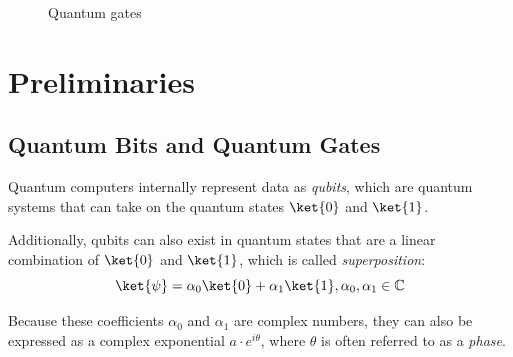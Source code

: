 \begin{figure}[t]
  \begin{minipage}{0.45\linewidth}
    \centering
    \scalebox{1.0} {
      
    }
    \scalebox{1.0} {
      
    }
    \scalebox{1.0}{
      
    }
    \scalebox{1.0} {
      
    }
  \end{minipage}
  \begin{minipage}{0.45\linewidth}
  \centering
    \scalebox{1.0} {
      
    }
    \scalebox{1.0} {
      
    }
    \scalebox{1.0} {
      
    }
    \scalebox{1.0} {
      
    }
  \end{minipage}
  \caption{Quantum gates}
  \label{fig-gates}
\end{figure}

\section{Preliminaries}
\label{Pre}
\subsection{Quantum Bits and Quantum Gates}
\label{Chap:Pre-qubits}
Quantum computers internally represent data as \emph{qubits}, which are quantum systems that can
take on the quantum states $\ket{0}$ and $\ket{1}$.

Additionally, qubits can also exist in quantum states that are a linear combination of $\ket{0}$ and
$\ket{1}$, which is called {\it superposition}:
\begin{equation}
\ket{\psi} = \alpha_0 \ket{0} + \alpha_1 \ket{1}, \alpha_0, \alpha_1 \in \mathbb{C}
\end{equation}

Because these coefficients $\alpha_0$ and $\alpha_1$ are complex numbers, they can also be expressed as
a complex exponential $a\cdot e^{i \theta}$, where $\theta$ is often referred to as a {\it phase}.


